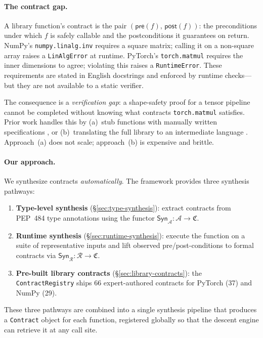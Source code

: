 \documentclass[11pt]{article}
\newcommand{\Syn}{\mathsf{Syn}}            %
\newcommand{\Pre}{\mathsf{pre}}            %
\newcommand{\Post}{\mathsf{post}}          %
\newcommand{\TypeAnn}{\mathcal{A}}         %
\newcommand{\RunObs}{\mathcal{R}}          %
\newcommand{\ContractSpace}{\mathfrak{C}}  %
\newcommand{\SynT}{\Syn_{\TypeAnn}}        %
\newcommand{\SynR}{\Syn_{\RunObs}}         %
\newcommand{\nPT}{37}                      %
\newcommand{\nNP}{29}                      %
\newcommand{\nTotal}{66}                   %
\begin{document}
\paragraph{The contract gap.}
A library function's contract is the pair
$(\Pre(f),\,\Post(f))$: the preconditions under which $f$ is safely
callable and the postconditions it guarantees on return.  NumPy's
\texttt{numpy.linalg.inv} requires a square matrix; calling it on a
non-square array raises a \texttt{LinAlgError} at runtime.  PyTorch's
\texttt{torch.matmul} requires the inner dimensions to agree; violating
this raises a \texttt{RuntimeError}.  These requirements are stated in
English docstrings and enforced by runtime checks---but they are not
available to a static verifier.

The consequence is a \emph{verification gap}: a shape-safety proof for
a tensor pipeline cannot be completed without knowing what contracts
\texttt{torch.matmul} satisfies.  Prior work handles this by (a)~stub
functions with manually written specifications \cite{gehr2018ai2}, or
(b)~translating the full library to an intermediate language
\cite{lattner2021mlir}.  Approach~(a) does not scale; approach~(b)
is expensive and brittle.

\paragraph{Our approach.}
We synthesize contracts \emph{automatically}.  The \JuGeo{} framework
provides three synthesis pathways:
\begin{enumerate}[label=(\arabic*)]
  \item \textbf{Type-level synthesis} (\S\ref{sec:type-synthesis}):
    extract contracts from PEP~484 type annotations using the functor
    $\SynT\colon \TypeAnn \to \ContractSpace$.
  \item \textbf{Runtime synthesis} (\S\ref{sec:runtime-synthesis}):
    execute the function on a suite of representative inputs and lift
    observed pre/post-conditions to formal contracts via
    $\SynR\colon \RunObs \to \ContractSpace$.
  \item \textbf{Pre-built library contracts} (\S\ref{sec:library-contracts}):
    the \texttt{ContractRegistry} ships \nTotal{} expert-authored
    contracts for PyTorch (\nPT{}) and NumPy (\nNP{}).
\end{enumerate}

These three pathways are combined into a single synthesis pipeline that
produces a \texttt{Contract} object for each function, registered
globally so that the descent engine can retrieve it at any call site.
\end{document}
